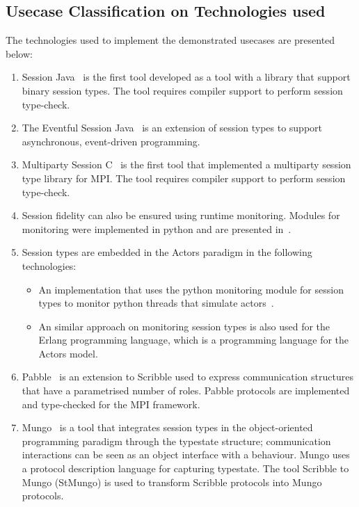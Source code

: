 \subsection{Usecase Classification on Technologies used}

The technologies used to implement the demonstrated usecases are presented
below:
%
\begin{enumerate}
	\item	Session Java~\cite{HU07TYPE-SAFE} is the first tool
			developed as a tool with a library that support binary session
			types. The tool requires compiler support to perform session
			type-check.

	\item	The Eventful Session Java~\cite{event} is an extension
			of session types to support asynchronous, event-driven programming.

	\item	Multiparty Session C~\cite{NYH12}
			is the first tool that implemented a
			multiparty session type library for MPI.
			The tool requires compiler support to perform session
			type-check.


	\item	Session fidelity can also be ensured using runtime monitoring.
			Modules for monitoring were implemented in python and are presented in~\cite{DBLP:conf/rv/NeykovaYH13}.

	\item	Session types are embedded in the Actors paradigm in the following technologies:
			\begin{itemize}
				\item	An implementation that uses the python monitoring module for session types to
						monitor python threads that simulate actors~\cite{DBLP:conf/coordination/NeykovaY14}.
				\item	An similar approach on monitoring session types is also used for the
						Erlang programming language, which is a programming language for the Actors model.
			\end{itemize}

	\item	Pabble~\cite{DBLP:conf/pdp/NgY14} is an extension to Scribble used to express
			communication structures that have a parametrised number of roles.
			Pabble protocols are implemented and type-checked for the MPI framework.

	\item	Mungo~\cite{mungo} is a tool that integrates session types in the object-oriented
			programming paradigm through the typestate structure; communication
			interactions can be seen as an object interface with a behaviour.
			Mungo uses a protocol description language for capturing typestate.
			The tool Scribble to Mungo (StMungo) is used to transform Scribble
			protocols into Mungo protocols.



\end{enumerate}
